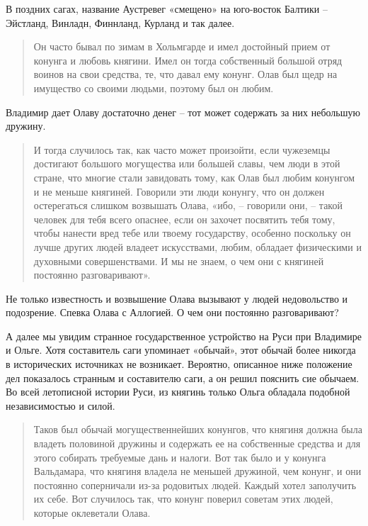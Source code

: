 В поздних сагах, название Аустревег «смещено» на юго-восток Балтики – Эйстланд, Винладн, Финнланд, Курланд и так далее.

\begin{quotation}
Он часто бывал по зимам в Хольмгарде и имел достойный прием от конунга и любовь княгини. Имел он тогда собственный большой отряд воинов на свои средства, те, что давал ему конунг. Олав был щедр на имущество со своими людьми, поэтому был он любим.
\end{quotation}

Владимир дает Олаву достаточно денег – тот может содержать за них небольшую дружину.

\begin{quotation}
И тогда случилось так, как часто может произойти, если чужеземцы достигают большого могущества или большей славы, чем люди в этой стране, что многие стали завидовать тому, как Олав был любим конунгом и не меньше княгиней. Говорили эти люди конунгу, что он должен остерегаться слишком возвышать Олава, «ибо, – говорили они, – такой человек для тебя всего опаснее, если он захочет посвятить тебя тому, чтобы нанести вред тебе или твоему государству, особенно поскольку он лучше других людей владеет искусствами, любим, обладает физическими и духовными совершенствами. И мы не знаем, о чем они с княгиней постоянно разговаривают». 
\end{quotation}

Не только известность и возвышение Олава вызывают у людей недовольство и подозрение. Спевка Олава с Аллогией. О чем они постоянно разговаривают?

А далее мы увидим странное государственное устройство на Руси при Владимире и Ольге. Хотя составитель саги упоминает «обычай», этот обычай более никогда в исторических источниках не возникает. Вероятно, описанное ниже положение дел показалось странным и составителю саги, а он решил пояснить сие обычаем. Во всей летописной истории Руси, из княгинь только Ольга обладала подобной независимостью и силой.

\begin{quotation}
Таков был обычай могущественнейших конунгов, что княгиня должна была владеть половиной дружины и содержать ее на собственные средства и для этого собирать требуемые дань и налоги. Вот так было и у конунга Вальдамара, что княгиня владела не меньшей дружиной, чем конунг, и они постоянно соперничали из-за родовитых людей. Каждый хотел заполучить их себе. Вот случилось так, что конунг поверил советам этих людей, которые оклеветали Олава. 
\end{quotation}

